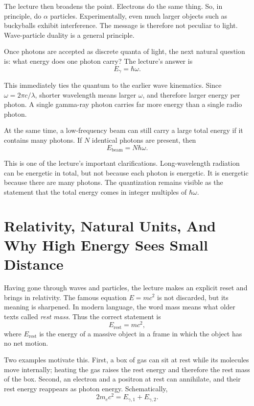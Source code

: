 The lecture then broadens the point. Electrons do the same thing. So, in principle, do \(\alpha\) particles. Experimentally, even much larger objects such as buckyballs exhibit interference. The message is therefore not peculiar to light. Wave-particle duality is a general principle.

Once photons are accepted as discrete quanta of light, the next natural question is: what energy does one photon carry? The lecture's answer is
\begin{equation}
E_\gamma = \hbar \omega.
\end{equation}

This immediately ties the quantum to the earlier wave kinematics. Since \(\omega = 2\pi c/\lambda\), shorter wavelength means larger \(\omega\), and therefore larger energy per photon. A single gamma-ray photon carries far more energy than a single radio photon.

At the same time, a low-frequency beam can still carry a large total energy if it contains many photons. If \(N\) identical photons are present, then
\begin{equation}
E_{\text{beam}} = N\hbar\omega.
\end{equation}

This is one of the lecture's important clarifications. Long-wavelength radiation can be energetic in total, but not because each photon is energetic. It is energetic because there are many photons. The quantization remains visible as the statement that the total energy comes in integer multiples of \(\hbar\omega\).

\section{Relativity, Natural Units, And Why High Energy Sees Small Distance}

Having gone through waves and particles, the lecture makes an explicit reset and brings in relativity. The famous equation \(E=mc^2\) is not discarded, but its meaning is sharpened. In modern language, the word mass means what older texts called \emph{rest mass}. Thus the correct statement is
\begin{equation}
E_{\mathrm{rest}} = mc^2,
\end{equation}
where \(E_{\mathrm{rest}}\) is the energy of a massive object in a frame in which the object has no net motion.

Two examples motivate this. First, a box of gas can sit at rest while its molecules move internally; heating the gas raises the rest energy and therefore the rest mass of the box. Second, an electron and a positron at rest can annihilate, and their rest energy reappears as photon energy. Schematically,
\begin{equation}
2m_e c^2 = E_{\gamma,1} + E_{\gamma,2}.
\end{equation}

